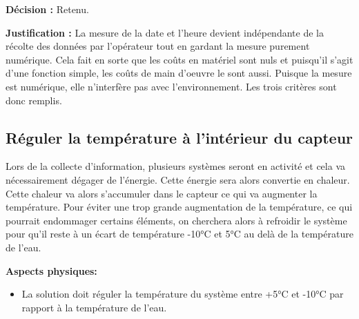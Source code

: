 \textbf{Décision :} Retenu.

\textbf{Justification :} La mesure de la date et l'heure devient indépendante de la récolte des données par l'opérateur tout en gardant la mesure purement numérique. Cela fait en sorte que les coûts en matériel sont nuls et puisqu'il s'agit d'une fonction simple, les coûts de main d'oeuvre le sont aussi. Puisque la mesure est numérique, elle n'interfère pas avec l'environnement. Les trois critères sont donc remplis.

\begin{table}[!htb]
\footnotesize
\centering
{}
\caption{Faisabilité des concepts pour mesurer la date et l'heure}
\label{t:Decision_date_heure}
\end{table}



\subsection{Réguler la température à l'intérieur du capteur}

Lors de la collecte d'information, plusieurs systèmes seront en activité et cela va nécessairement dégager de l'énergie. Cette énergie sera alors convertie en chaleur. Cette chaleur va alors s'accumuler dans le capteur ce qui va augmenter la température. Pour éviter une trop grande augmentation de la température, ce qui pourrait endommager certains éléments, on cherchera alors à refroidir le système pour qu'il reste à un écart de température -10°C et 5°C au delà de la température de l'eau.

\textbf{Aspects physiques:}
\begin{itemize}[label = {--}]
    \item La solution doit réguler la température du système entre +5°C et -10°C par rapport à la température de l'eau.
\end{itemize}

